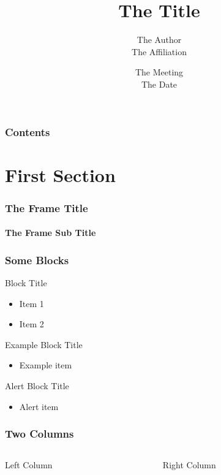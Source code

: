 \documentclass[final, hyperref={pdfpagemode=FullScreen}]{beamer}
\title[author@cern.ch]{The Title}
\author{The Author\\The Affiliation}
\date[Meeting Abbrev]{The Meeting\\The Date}
\begin{document}

\begin{frame}[label=titlepage]
	\centering \resizebox{1.5cm}{!}{}
	
	\titlepage
\end{frame}


\begin{frame}[label=toc]
	\frametitle{Contents}

	\tableofcontents
\end{frame}


\section{First Section}


\begin{frame}
	\frametitle{The Frame Title}
	\framesubtitle{The Frame Sub Title}
	
\end{frame}


\begin{frame}
	\frametitle{Some Blocks}
	\small
	
	\begin{block}{\small Block Title}
		\begin{itemize}
			\item Item 1
			\item Item 2
		\end{itemize}
	\end{block}
	
	\begin{exampleblock}{\small Example Block Title}
		\begin{itemize}
			\item Example item
		\end{itemize}
	\end{exampleblock}
	
	\begin{alertblock}{\small Alert Block Title}
		\begin{itemize}
			\item Alert item
		\end{itemize}
	\end{alertblock}
\end{frame}

\begin{frame}
	\frametitle{Two Columns}
	\footnotesize
	
	\begin{columns}
		\begin{column}{0.5\textwidth}
			Left Column
		\end{column}
		\begin{column}{0.5\textwidth}
			Right Column
		\end{column}
	\end{columns}
\end{frame}
\end{document}
